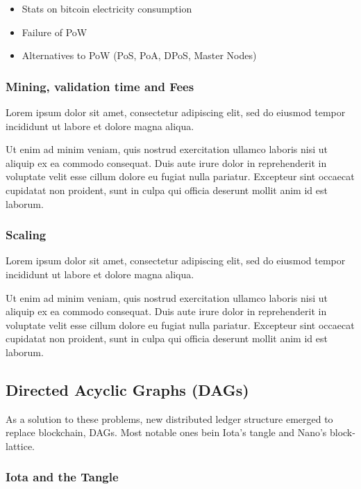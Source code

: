 \documentclass[a4paper]{article}
\begin{document}
\begin{itemize}
\item Stats on bitcoin electricity consumption
\item Failure of PoW
\item Alternatives to PoW (PoS, PoA, DPoS, Master Nodes)
\end{itemize}

\subsubsection{Mining, validation time and Fees}

Lorem ipsum dolor sit amet, consectetur adipiscing elit, sed do eiusmod tempor incididunt ut labore et dolore magna aliqua.

Ut enim ad minim veniam, quis nostrud exercitation ullamco laboris nisi ut aliquip ex ea commodo consequat. Duis aute irure dolor in reprehenderit in voluptate velit esse cillum dolore eu fugiat nulla pariatur. Excepteur sint occaecat cupidatat non proident, sunt in culpa qui officia deserunt mollit anim id est laborum.

\subsubsection{Scaling}

Lorem ipsum dolor sit amet, consectetur adipiscing elit, sed do eiusmod tempor incididunt ut labore et dolore magna aliqua.

Ut enim ad minim veniam, quis nostrud exercitation ullamco laboris nisi ut aliquip ex ea commodo consequat. Duis aute irure dolor in reprehenderit in voluptate velit esse cillum dolore eu fugiat nulla pariatur. Excepteur sint occaecat cupidatat non proident, sunt in culpa qui officia deserunt mollit anim id est laborum.

\subsection{Directed Acyclic Graphs (DAGs)}

As a solution to these problems, new distributed ledger structure emerged to replace blockchain, DAGs. Most notable ones bein Iota's tangle and Nano's block-lattice. 

\subsubsection{Iota and the Tangle}
\end{document}
